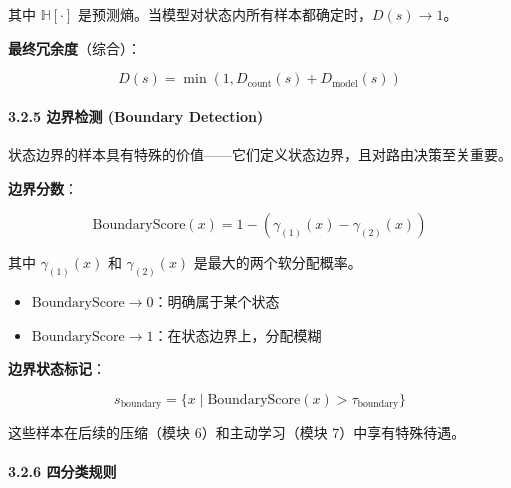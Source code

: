 \documentclass[
  12pt,
]{ctexart}
\providecommand{\tightlist}{%
  \setlength{\itemsep}{0pt}\setlength{\parskip}{0pt}}
\begin{document}
其中 \(\mathbb{H}[\cdot]\)
是预测熵。当模型对状态内所有样本都确定时，\(D(s) \to 1\)。

\textbf{最终冗余度}（综合）：

\[
D(s) = \min(1, D_{\text{count}}(s) + D_{\text{model}}(s))
\]

\paragraph{3.2.5 边界检测 (Boundary
Detection)}\label{ux8fb9ux754cux68c0ux6d4b-boundary-detection}

状态边界的样本具有特殊的价值------它们定义状态边界，且对路由决策至关重要。

\textbf{边界分数}：

\[
\text{BoundaryScore}(x) = 1 - (\gamma_{(1)}(x) - \gamma_{(2)}(x))
\]

其中 \(\gamma_{(1)}(x)\) 和 \(\gamma_{(2)}(x)\) 是最大的两个软分配概率。

\begin{itemize}
\tightlist
\item
  \(\text{BoundaryScore} \to 0\)：明确属于某个状态
\item
  \(\text{BoundaryScore} \to 1\)：在状态边界上，分配模糊
\end{itemize}

\textbf{边界状态标记}：

\[
s_{\text{boundary}} = \{ x \mid \text{BoundaryScore}(x) > \tau_{\text{boundary}} \}
\]

这些样本在后续的压缩（模块 6）和主动学习（模块 7）中享有特殊待遇。

\paragraph{3.2.6 四分类规则}\label{ux56dbux5206ux7c7bux89c4ux5219}
\end{document}
